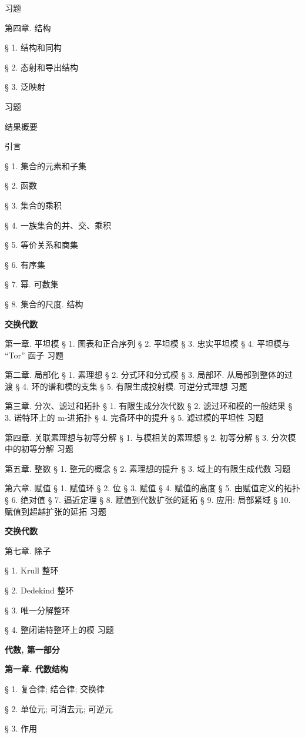 习题

第四章. 结构

§ 1. 结构和同构

§ 2. 态射和导出结构

§ 3. 泛映射

习题

结果概要

引言

§ 1. 集合的元素和子集

§ 2. 函数

§ 3. 集合的乘积

§ 4. 一族集合的并、交、乘积

§ 5. 等价关系和商集

§ 6. 有序集

§ 7. 幂. 可数集

§ 8. 集合的尺度. 结构

\textbf{交换代数}

第一章. 平坦模 § 1. 图表和正合序列 § 2. 平坦模 § 3. 忠实平坦模 § 4. 平坦模与 ``Tor'' 函子 习题

第二章. 局部化 § 1. 素理想 § 2. 分式环和分式模 § 3. 局部环. 从局部到整体的过渡 § 4. 环的谱和模的支集 § 5. 有限生成投射模. 可逆分式理想 习题

第三章. 分次、滤过和拓扑 § 1. 有限生成分次代数 § 2. 滤过环和模的一般结果 § 3. 诺特环上的 m-进拓扑 § 4. 完备环中的提升 § 5. 滤过模的平坦性 习题

第四章. 关联素理想与初等分解 § 1. 与模相关的素理想 § 2. 初等分解 § 3. 分次模中的初等分解 习题

第五章. 整数 § 1. 整元的概念 § 2. 素理想的提升 § 3. 域上的有限生成代数 习题

第六章. 赋值 § 1. 赋值环 § 2. 位 § 3. 赋值 § 4. 赋值的高度 § 5. 由赋值定义的拓扑 § 6. 绝对值 § 7. 逼近定理 § 8. 赋值到代数扩张的延拓 § 9. 应用: 局部紧域 § 10. 赋值到超越扩张的延拓 习题

\textbf{交换代数}

第七章. 除子

§ 1. Krull 整环

§ 2. Dedekind 整环

§ 3. 唯一分解整环

§ 4. 整闭诺特整环上的模 习题

\textbf{代数, 第一部分}

\textbf{第一章. 代数结构}

§ 1. 复合律; 结合律; 交换律

§ 2. 单位元; 可消去元; 可逆元

§ 3. 作用

